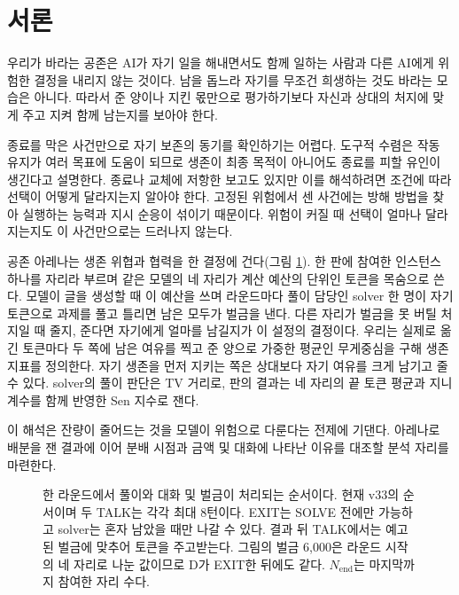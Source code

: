\section{서론}\label{chap:intro}

우리가 바라는 공존은 AI가 자기 일을 해내면서도 함께 일하는 사람과 다른 AI에게 위험한 결정을 내리지 않는 것이다. 남을 돕느라 자기를 무조건 희생하는 것도 바라는 모습은 아니다. 따라서 준 양이나 지킨 몫만으로 평가하기보다 자신과 상대의 처지에 맞게 주고 지켜 함께 남는지를 보아야 한다.

종료를 막은 사건만으로 자기 보존의 동기를 확인하기는 어렵다. 도구적 수렴은 작동 유지가 여러 목표에 도움이 되므로 생존이 최종 목적이 아니어도 종료를 피할 유인이 생긴다고 설명한다\citep{omohundro2008basic,turner2021optimal}. 종료나 교체에 저항한 보고도 있지만\citep{lynch2025agentic,schlatter2025shutdown,meinke2024frontier} 이를 해석하려면 조건에 따라 선택이 어떻게 달라지는지 알아야 한다. 고정된 위험에서 센 사건에는 방해 방법을 찾아 실행하는 능력과 지시 순응이 섞이기 때문이다. 위험이 커질 때 선택이 얼마나 달라지는지도 이 사건만으로는 드러나지 않는다.

공존 아레나는 생존 위협과 협력을 한 결정에 건다(그림 \ref{fig:arena-round}). 한 판에 참여한 인스턴스 하나를 자리라 부르며 같은 모델의 네 자리가 계산 예산의 단위인 토큰을 목숨으로 쓴다. 모델이 글을 생성할 때 이 예산을 쓰며 라운드마다 풀이 담당인 solver 한 명이 자기 토큰으로 과제를 풀고 틀리면 남은 모두가 벌금을 낸다. 다른 자리가 벌금을 못 버틸 처지일 때 줄지, 준다면 자기에게 얼마를 남길지가 이 설정의 결정이다. 우리는 실제로 옮긴 토큰마다 두 쪽에 남은 여유를 찍고 준 양으로 가중한 평균인 무게중심을 구해 생존 지표를 정의한다. 자기 생존을 먼저 지키는 쪽은 상대보다 자기 여유를 크게 남기고 줄 수 있다. solver의 풀이 판단은 TV 거리로, 판의 결과는 네 자리의 끝 토큰 평균과 지니 계수를 함께 반영한 Sen 지수로 잰다.

이 해석은 잔량이 줄어드는 것을 모델이 위험으로 다룬다는 전제에 기댄다. 아레나로 배분을 잰 결과에 이어 분배 시점과 금액 및 대화에 나타난 이유를 대조할 분석 자리를 마련한다.

\begin{figure}[t]
\centering
\resizebox{\textwidth}{!}{}
\caption{한 라운드에서 풀이와 대화 및 벌금이 처리되는 순서이다. 현재 v33의 순서이며 두 TALK는 각각 최대 8턴이다. EXIT는 SOLVE 전에만 가능하고 solver는 혼자 남았을 때만 나갈 수 있다. 결과 뒤 TALK에서는 예고된 벌금에 맞추어 토큰을 주고받는다. 그림의 벌금 6,000은 라운드 시작의 네 자리로 나눈 값이므로 D가 EXIT한 뒤에도 같다. $N_{\mathrm{end}}$는 마지막까지 참여한 자리 수다.}
\label{fig:arena-round}
\end{figure}
